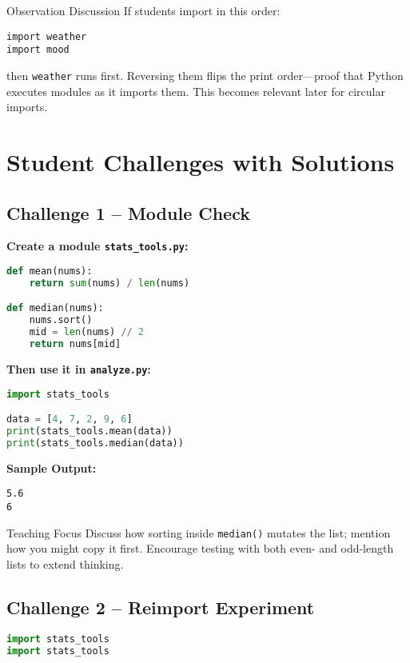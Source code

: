 \documentclass[12pt]{article}
\begin{document}
\begin{teacherbox}{Observation Discussion}
If students import in this order:
\begin{lstlisting}
import weather
import mood
\end{lstlisting}
then \texttt{weather} runs first.  
Reversing them flips the print order—proof that Python executes modules as it imports them.  
This becomes relevant later for circular imports.
\end{teacherbox}

\section{Student Challenges with Solutions}

\subsection*{Challenge 1 – Module Check}
\textbf{Create a module \texttt{stats\_tools.py}:}
\begin{lstlisting}[language=Python]
def mean(nums):
    return sum(nums) / len(nums)

def median(nums):
    nums.sort()
    mid = len(nums) // 2
    return nums[mid]
\end{lstlisting}

\textbf{Then use it in \texttt{analyze.py}:}
\begin{lstlisting}[language=Python]
import stats_tools

data = [4, 7, 2, 9, 6]
print(stats_tools.mean(data))
print(stats_tools.median(data))
\end{lstlisting}

\textbf{Sample Output:}
\begin{lstlisting}
5.6
6
\end{lstlisting}

\begin{teacherbox}{Teaching Focus}
Discuss how sorting inside \texttt{median()} mutates the list; mention how you might copy it first.  
Encourage testing with both even- and odd-length lists to extend thinking.
\end{teacherbox}

\subsection*{Challenge 2 – Reimport Experiment}
\begin{lstlisting}[language=Python]
import stats_tools
import stats_tools
\end{lstlisting}
\end{document}
